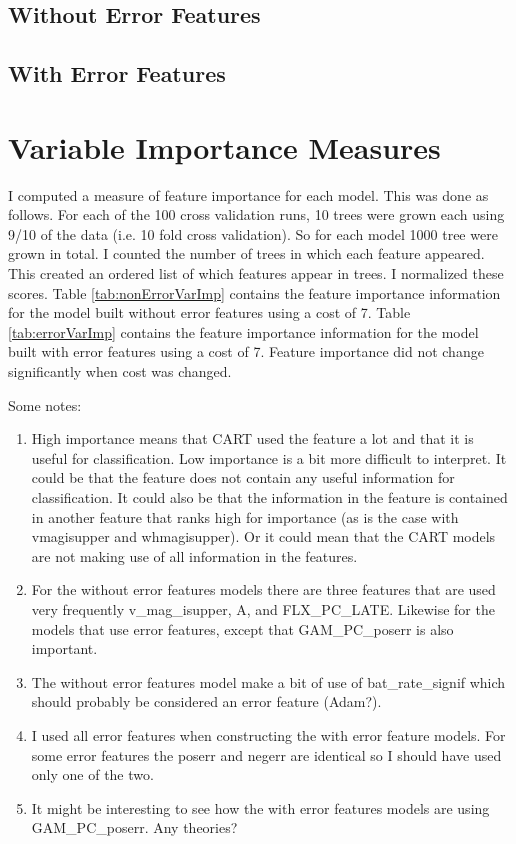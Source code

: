 \documentclass[10pt]{article}
\begin{document}
\subsection{Without Error Features}


\subsection{With Error Features}


\section{Variable Importance Measures}
I computed a measure of feature importance for each model. This was done as follows. For each of the 100 cross validation runs, 10 trees were grown each using 9/10 of the data (i.e. 10 fold cross validation). So for each model 1000 tree were grown in total. I counted the number of trees in which each feature appeared. This created an ordered list of which features appear in trees. I normalized these scores. Table \ref{tab:nonErrorVarImp} contains the feature importance information for the model built without error features using a cost of 7. Table \ref{tab:errorVarImp} contains the feature importance information for the model built with error features using a cost of 7. Feature importance did not change significantly when cost was changed.

Some notes:
\begin{enumerate}
\item High importance means that CART used the feature a lot and that it is useful for classification. Low importance is a bit more difficult to interpret. It could be that the feature does not contain any useful information for classification. It could also be that the information in the feature is contained in another feature that ranks high for importance (as is the case with vmagisupper and whmagisupper). Or it could mean that the CART models are not making use of all information in the features.
\item For the without error features models there are three features that are used very frequently v\_mag\_isupper, A, and FLX\_PC\_LATE. Likewise for the models that use error features, except that GAM\_PC\_poserr is also important.
\item The without error features model make a bit of use of bat\_rate\_signif which should probably be considered an error feature (Adam?).
\item I used all error features when constructing the with error feature models. For some error features the poserr and negerr are identical so I should have used only one of the two.
\item It might be interesting to see how the with error features models are using GAM\_PC\_poserr. Any theories?
\end{enumerate}
\end{document}
